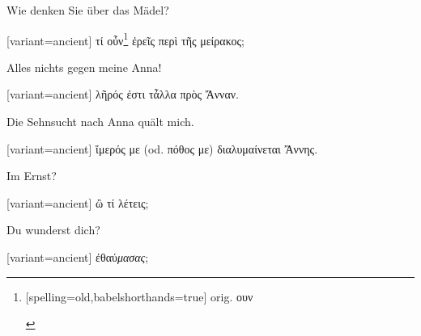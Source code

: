 Wie denken Sie über das Mädel? 

\switchcolumn

\begin{greek}[variant=ancient]%
τί οὖν\footnote{\begin{german}[spelling=old,babelshorthands=true]%
orig. \textgreek[variant=ancient]{ουν}\end{german}%
} ἐρεῖς περὶ τῆς μείρακος;

\end{greek}%
\switchcolumn*

Alles nichts gegen meine Anna! 

\switchcolumn

\begin{greek}[variant=ancient]%
λῆρός ἐστι τἆλλα πρὸς Ἄνναν.

\end{greek}%
\switchcolumn*

Die Sehnsucht nach Anna quält mich. 

\switchcolumn

\begin{greek}[variant=ancient]%
ἵμερός με (\textgerman[spelling=old,babelshorthands=true]{od.} πόθος
με) διαλυμαίνεται Ἄννης.

\end{greek}%
\switchcolumn*

Im Ernst? 

\switchcolumn

\begin{greek}[variant=ancient]%
ὢ τί λέτεις;

\end{greek}%
\switchcolumn*

Du wunderst dich? 

\switchcolumn

\begin{greek}[variant=ancient]%
ἐθαύ\emph{μασας};

\end{greek}%
\switchcolumn*

